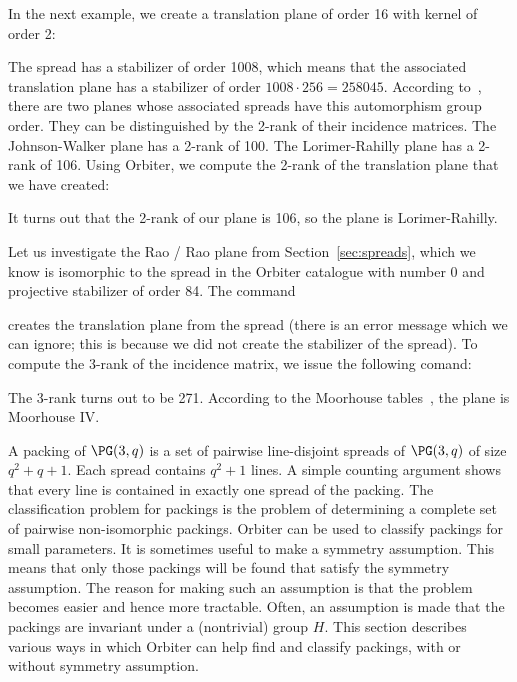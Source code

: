 \bigskip

In the next example, we create a translation plane of order 16 with kernel of order 2:
{\tt

}
The spread has a stabilizer of order 1008, which means that the associated translation plane has a stabilizer of order $1008 \cdot 256 = 258045.$
According to~\cite{Moorhouse:tables:16}, there are two planes 
whose associated spreads have this automorphism group order. They can be distinguished by the 2-rank of their incidence matrices. 
The Johnson-Walker plane has a 2-rank of 100. 
The Lorimer-Rahilly plane has a 2-rank of 106. 
Using Orbiter, we compute the 2-rank of the translation plane that we have created:
{\tt

}
It turns out that the 2-rank of our plane is 106, so the plane is Lorimer-Rahilly.


\bigskip

Let us investigate the Rao / Rao plane from Section~\ref{sec:spreads}, which we know is isomorphic to the spread in the Orbiter catalogue with number 0 and projective stabilizer of order 84.
The command  
{\tt

}
creates the translation plane from the spread 
(there is an error message which we can ignore; 
this is because we did not create the stabilizer of the spread).
To compute the 3-rank of the incidence matrix, we issue the following comand:
{\tt

}
The 3-rank turns out to be 271. According to the Moorhouse tables~\cite{Moorhouse:tables:27}, 
the plane is Moorhouse IV.


A packing of $\PG(3,q)$ 
is a set of pairwise line-disjoint spreads of $\PG(3,q)$ of size $q^2+q+1.$ 
Each spread contains $q^2+1$ lines. 
A simple counting argument shows that 
every line is contained in exactly one spread of the packing.
The classification problem for packings 
is the problem of determining a complete set of pairwise non-isomorphic 
packings. 
Orbiter can be used to classify packings for small parameters. 
It is sometimes useful to make a symmetry assumption.
This means that only those packings will be found that satisfy the symmetry assumption. 
The reason for making such an assumption is that the problem becomes easier and hence more tractable.
Often, an assumption is made that the packings are invariant under a (nontrivial) group $H$.
This section describes various ways in which Orbiter can help find and classify packings, 
with or without symmetry assumption.

